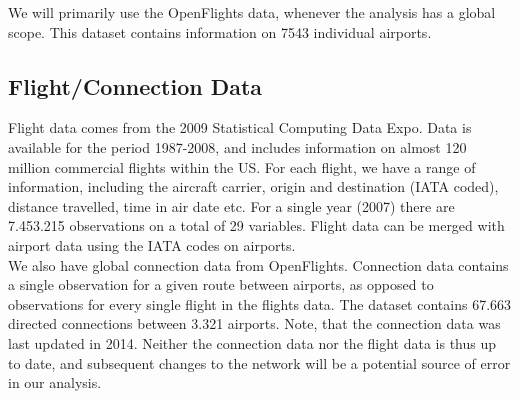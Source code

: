 We will primarily use the OpenFlights data, whenever the analysis has a global scope. This dataset contains information on 7543 individual airports.

\subsection{Flight/Connection Data}
\label{subsec:Flight_Data}
Flight data comes from the 2009 Statistical Computing Data Expo. Data is available for the period 1987-2008, and  includes information on almost 120 million commercial flights within the US. For each flight, we have a range of information, including the aircraft carrier, origin and destination (IATA coded), distance travelled, time in air date etc. For a single year (2007) there are 7.453.215 observations on a total of 29 variables. Flight data can be merged with airport data using the IATA codes on airports. \medskip\\
We also have global connection data from OpenFlights. Connection data contains a single observation for a given route between airports, as opposed to observations for every single flight in the flights data. The dataset contains 67.663 directed connections between 3.321 airports. Note, that the connection data was last updated in 2014. Neither the connection data nor the flight data is thus up to date, and subsequent changes to the network will be a potential source of error in our analysis.



